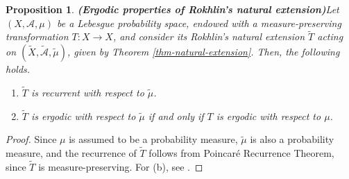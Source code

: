 \documentclass[11pt]{article}
\newtheorem{prop}[thm]{Proposition}
\theoremstyle{definition}
\theoremstyle{remark}
\theoremstyle{plain}
\begin{document}
\begin{prop}{\bf (Ergodic properties of Rokhlin's natural extension)}\label{prop-ergodic-properties-natural-ext}
	Let $ (X,\mathcal{A},\mu) $ be a Lebesgue probability space, endowed with a measure-preserving transformation $ T\colon X \to X $, and consider its Rokhlin's natural extension $ \widetilde{T} $ acting on $ (\widetilde{X},\widetilde{\mathcal{A}},\widetilde{\mu}) $, given by Theorem \ref{thm-natural-extension}. Then, the following holds.
	\begin{enumerate}[label={\em (\alph*)}]
		\item 	$ \widetilde{T} $ is recurrent with respect to $ \widetilde{\mu} $.
		\item 	$ \widetilde{T} $ is ergodic with respect to $ \widetilde{\mu} $ if and only if $ {T} $ is ergodic with respect to $ {\mu} $.
	\end{enumerate}

\end{prop}
\begin{proof} Since $ \mu $ is assumed to be a probability measure,  $ \widetilde{\mu} $ is also a probability measure, and the recurrence of $ \widetilde{T} $ follows from Poincaré Recurrence Theorem, since $ \widetilde T $ is measure-preserving. For (b), see {\normalfont \cite[Thm. 8.4.3]{UrbanskiRoyMunday1}}.
\end{proof}
\end{document}
